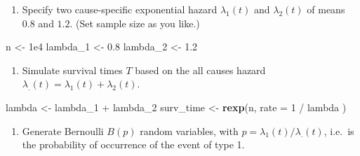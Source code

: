 \documentclass[]{book}
\newenvironment{Shaded}{\begin{snugshade}}{\end{snugshade}}
\newcommand{\KeywordTok}[1]{\textcolor[rgb]{0.13,0.29,0.53}{\textbf{{#1}}}}
\newcommand{\DataTypeTok}[1]{\textcolor[rgb]{0.13,0.29,0.53}{{#1}}}
\newcommand{\DecValTok}[1]{\textcolor[rgb]{0.00,0.00,0.81}{{#1}}}
\newcommand{\FloatTok}[1]{\textcolor[rgb]{0.00,0.00,0.81}{{#1}}}
\newcommand{\StringTok}[1]{\textcolor[rgb]{0.31,0.60,0.02}{{#1}}}
\newcommand{\CommentTok}[1]{\textcolor[rgb]{0.56,0.35,0.01}{\textit{{#1}}}}
\newcommand{\NormalTok}[1]{{#1}}
\providecommand{\tightlist}{%
  \setlength{\itemsep}{0pt}\setlength{\parskip}{0pt}}
\theoremstyle{definition}
\theoremstyle{definition}
\theoremstyle{definition}
\theoremstyle{remark}
\begin{document}
\begin{enumerate}
\def\labelenumi{\arabic{enumi}.}
\tightlist
\item
  Specify two cause-specific exponential hazard \(\lambda_1(t)\) and
  \(\lambda_2(t)\) of means \(0.8\) and \(1.2\). (Set sample size as you
  like.)
\end{enumerate}

\begin{Shaded}
\begin{Highlighting}[]
\NormalTok{n        <-}\StringTok{ }\FloatTok{1e4}
\NormalTok{lambda_1 <-}\StringTok{ }\FloatTok{0.8}
\NormalTok{lambda_2 <-}\StringTok{ }\FloatTok{1.2}
\end{Highlighting}
\end{Shaded}

\begin{enumerate}
\def\labelenumi{\arabic{enumi}.}
\setcounter{enumi}{1}
\tightlist
\item
  Simulate survival times \(T\) based on the all causes hazard
  \(\lambda_.(t) = \lambda_1(t) + \lambda_2(t)\).
\end{enumerate}

\begin{Shaded}
\begin{Highlighting}[]
\NormalTok{lambda    <-}\StringTok{ }\NormalTok{lambda_1 +}\StringTok{ }\NormalTok{lambda_2 }
\NormalTok{surv_time <-}\StringTok{ }\KeywordTok{rexp}\NormalTok{(n,}
  \DataTypeTok{rate =} \DecValTok{1} \NormalTok{/}\StringTok{ }\NormalTok{lambda}
\NormalTok{)}
\end{Highlighting}
\end{Shaded}

\begin{enumerate}
\def\labelenumi{\arabic{enumi}.}
\setcounter{enumi}{2}
\tightlist
\item
  Generate Bernoulli \(B(p)\) random variables, with
  \(p = \lambda_1(t) / \lambda_.(t)\), i.e.~is the probability of
  occurrence of the event of type 1.
\end{enumerate}

\begin{Shaded}
\end{Shaded}
\end{document}
